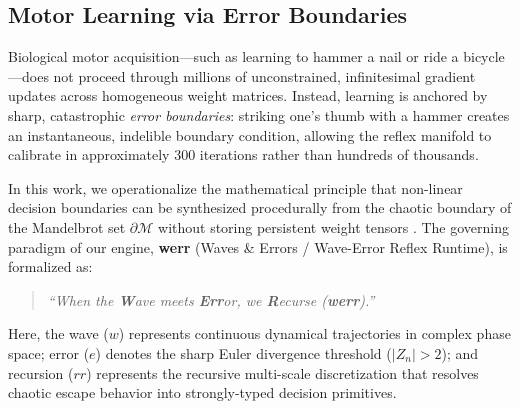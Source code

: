 \documentclass[10pt,journal,compsoc,twocolumn]{article}
\begin{document}
\subsection{Motor Learning via Error Boundaries}
Biological motor acquisition---such as learning to hammer a nail or ride a bicycle---does not proceed through millions of unconstrained, infinitesimal gradient updates across homogeneous weight matrices. Instead, learning is anchored by sharp, catastrophic \textit{error boundaries}: striking one's thumb with a hammer creates an instantaneous, indelible boundary condition, allowing the reflex manifold to calibrate in approximately 300 iterations rather than hundreds of thousands.

In this work, we operationalize the mathematical principle that non-linear decision boundaries can be synthesized procedurally from the chaotic boundary of the Mandelbrot set $\partial \mathcal{M}$ without storing persistent weight tensors \cite{dagli2026mandelbrot}. The governing paradigm of our engine, \textbf{werr} (Waves \& Errors / Wave-Error Reflex Runtime), is formalized as:
\begin{quote}
\textit{``When the \textbf{W}ave meets \textbf{Err}or, we \textbf{R}ecurse (\textbf{werr}).''}
\end{quote}
Here, the wave ($w$) represents continuous dynamical trajectories in complex phase space; error ($e$) denotes the sharp Euler divergence threshold ($|Z_n| > 2$); and recursion ($rr$) represents the recursive multi-scale discretization that resolves chaotic escape behavior into strongly-typed decision primitives.
\end{document}
